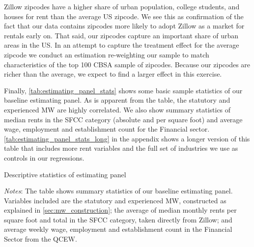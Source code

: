 Zillow zipcodes have a higher share of urban population, college students, and houses for 
rent than the average US zipcode. We see this as confirmation of the fact that our data 
contains zipcodes more likely to adopt Zillow as a market for rentals early on. That said, 
our zipcodes capture an important share of urban areas in the US. In an attempt to capture 
the treatment effect for the average zipcode we conduct an estimation re-weighting our 
sample to match characteristics of the top 100 CBSA sample of zipcodes. Because our 
zipcodes are richer than the average, we expect to find a larger effect in this exercise.

Finally, \autoref{tab:estimating_panel_stats} shows some basic sample statistics of our 
baseline estimating panel. As is apparent from the table, the statutory and experienced
MW are highly correlated. We also show summary statistics of median rents in the SFCC 
category (absolute and per square foot) and average wage, employment and establishment 
count for the Financial sector. \autoref{tab:estimating_panel_stats_long} in the appendix 
shows a longer version of this table that includes more rent variables and the full set
of industries we use as controls in our regressions.

\begin{table}[h!]
	\caption{Descriptive statistics of estimating panel}
	\centering
	\label{tab:estimating_panel_stats}    
	
	\begin{minipage}{0.95\textwidth} \footnotesize
		\vspace{3mm} 
		\textit{Notes}: The table shows summary statistics of our baseline estimating panel.
		Variables included are the statutory and experienced MW, constructed as explained in
		\autoref{sec:mw_construction}; the average of median monthly rents per square foot 
		and total in the SFCC category, taken directly from Zillow; and average weekly wage, 
		employment and establishment count in the Financial Sector from the QCEW.
	\end{minipage}
\end{table}
